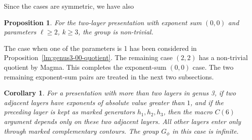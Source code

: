 \documentclass{article}
\newtheorem{cy}[theorem]{Corollary}
\newtheorem{prop}[theorem]{Proposition}
\begin{document}

Since the cases are symmetric, we have also
\begin{prop}
For the two-layer presentation with exponent sum $(0,0)$ and parameters
$\ell\geq 2$, $k\geq 3$, the group is non-trivial. \end{prop}

The case when one of the parameters is 1 has been considered in
Proposition~\ref{lm:genus3-00-quotient}.  The remaining case $(2,2)$ has a
non-trivial quotient by Magma.  This completes the exponent-sum $(0,0)$ case.  The two remaining
exponent-sum pairs are treated in the next two subsections.
\begin{cy}
For a presentation with more than two layers in genus 3, if two adjacent layers have
exponents of absolute value greater than \(1\), and if the preceding layer is
kept as marked generators \(h_1,h_2,h_3\), then the macro \(C(6)\) argument
depends only on these two adjacent layers. All other layers enter only through
marked complementary contours. The group $G_{\phi}$ in this case is infinite.
\end{cy}
\end{document}
